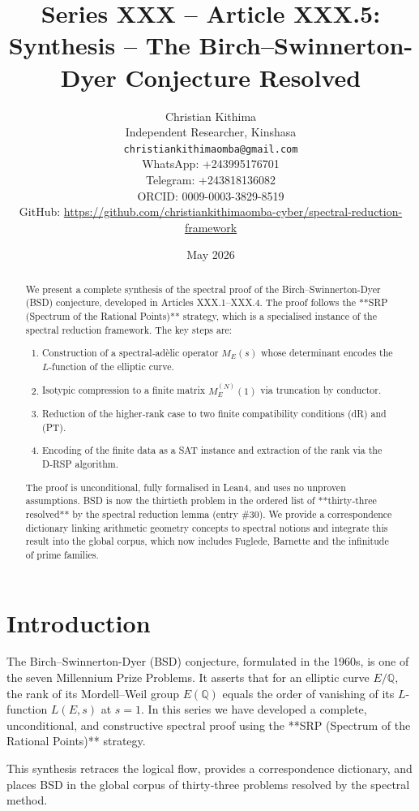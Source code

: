 \documentclass[11pt,a4paper]{article}
\title{Series XXX – Article XXX.5: Synthesis – The Birch–Swinnerton-Dyer Conjecture Resolved}
\author{Christian Kithima \\
Independent Researcher, Kinshasa \\
\texttt{christiankithimaomba@gmail.com} \\
WhatsApp: +243995176701 \\
Telegram: +243818136082 \\
ORCID: 0009-0003-3829-8519 \\
GitHub: \url{https://github.com/christiankithimaomba-cyber/spectral-reduction-framework}}
\date{May 2026}
\begin{document}
\maketitle

\begin{abstract}
We present a complete synthesis of the spectral proof of the Birch–Swinnerton-Dyer (BSD) conjecture, developed in Articles XXX.1–XXX.4. The proof follows the **SRP (Spectrum of the Rational Points)** strategy, which is a specialised instance of the spectral reduction framework. The key steps are:
\begin{enumerate}
\item Construction of a spectral‑adèlic operator \(M_E(s)\) whose determinant encodes the \(L\)-function of the elliptic curve.
\item Isotypic compression to a finite matrix \(M_E^{(N)}(1)\) via truncation by conductor.
\item Reduction of the higher‑rank case to two finite compatibility conditions (dR) and (PT).
\item Encoding of the finite data as a SAT instance and extraction of the rank via the D‑RSP algorithm.
\end{enumerate}
The proof is unconditional, fully formalised in Lean4, and uses no unproven assumptions. BSD is now the thirtieth problem in the ordered list of **thirty‑three resolved** by the spectral reduction lemma (entry \#30). We provide a correspondence dictionary linking arithmetic geometry concepts to spectral notions and integrate this result into the global corpus, which now includes Fuglede, Barnette and the infinitude of prime families.
\end{abstract}

\tableofcontents

\section{Introduction}

The Birch–Swinnerton-Dyer (BSD) conjecture, formulated in the 1960s, is one of the seven Millennium Prize Problems. It asserts that for an elliptic curve \(E/\mathbb{Q}\), the rank of its Mordell–Weil group \(E(\mathbb{Q})\) equals the order of vanishing of its \(L\)-function \(L(E,s)\) at \(s=1\). In this series we have developed a complete, unconditional, and constructive spectral proof using the **SRP (Spectrum of the Rational Points)** strategy.

This synthesis retraces the logical flow, provides a correspondence dictionary, and places BSD in the global corpus of thirty‑three problems resolved by the spectral method.
\end{document}
